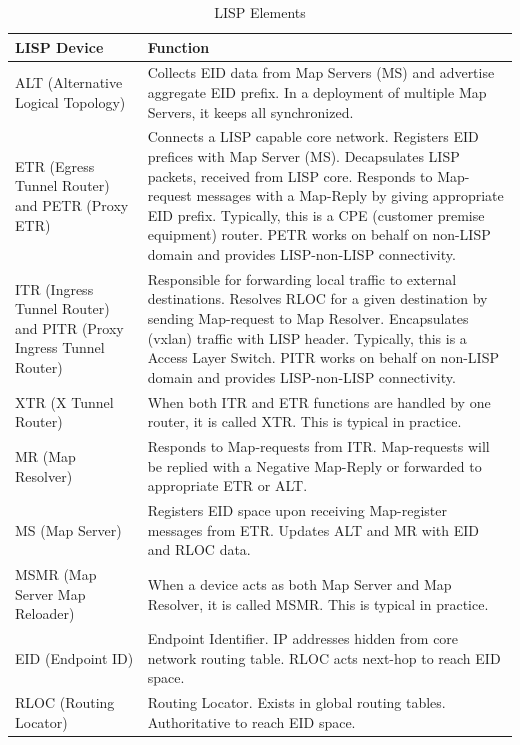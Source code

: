 \begin{table}[H]
	\centering
	\begin{tabularx}{\textwidth}{p{6.6cm} | X}
		\rowcolor{gray!50}
		\textbf{LISP Device} & \textbf{Function} \\
		\hline	
		ALT (Alternative Logical Topology) & Collects EID data from Map Servers (MS) and advertise aggregate EID prefix. In a deployment of multiple Map Servers, it keeps all synchronized. \\
		
		ETR (Egress Tunnel Router) and PETR (Proxy ETR) & Connects a LISP capable core network. Registers EID prefices with Map Server (MS). Decapsulates LISP packets, received from LISP core. Responds to Map-request messages with a Map-Reply by giving appropriate EID prefix. Typically, this is a CPE (customer premise equipment) router. PETR works on behalf on non-LISP domain and provides LISP-non-LISP connectivity. \\ 
		
		ITR (Ingress Tunnel Router) and PITR (Proxy Ingress Tunnel Router) & Responsible for forwarding local traffic to external destinations. Resolves RLOC for a given destination by sending Map-request to Map Resolver. Encapsulates (vxlan) traffic with LISP header. Typically, this is a Access Layer Switch. PITR works on behalf on non-LISP domain and provides LISP-non-LISP connectivity. \\
		
		XTR (X Tunnel Router) & When both ITR and ETR functions are handled by one router, it is called XTR. This is typical in practice. \\
		
		MR (Map Resolver) & Responds to Map-requests from ITR. Map-requests will be replied with a Negative Map-Reply or forwarded to appropriate ETR or ALT. \\
		
		MS (Map Server) & Registers EID space upon receiving Map-register messages from ETR. Updates ALT and MR with EID and RLOC data. \\
		
		MSMR (Map Server Map Reloader) & When a device acts as both Map Server and Map Resolver, it is called MSMR. This is typical in practice. \\
		
		EID (Endpoint ID) & Endpoint Identifier. IP addresses hidden from core network routing table. RLOC acts next-hop to reach EID space. \\
		
		RLOC (Routing Locator) & Routing Locator. Exists in global routing tables. Authoritative to reach EID space. \\
		
	\end{tabularx}
	\caption{LISP Elements}
	\label{tab:my-label}
\end{table}

